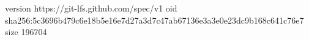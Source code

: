 version https://git-lfs.github.com/spec/v1
oid sha256:5c3696b479c6e18b5e16e7d27a3d7c47ab67136e3a3e0e23dc9b168c641c76e7
size 196704

